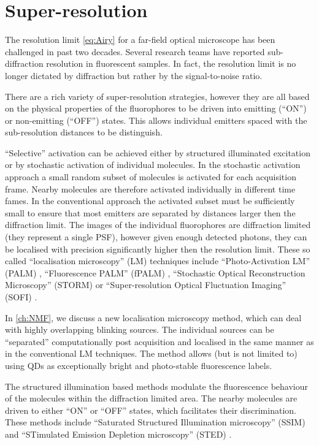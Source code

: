 \section{Super-resolution\label{sec:super-resolution}}

The resolution limit \autoref{eq:Airy} for a far-field optical microscope has been challenged in past two decades. Several research teams have reported sub-diffraction resolution in fluorescent samples. In fact, the resolution limit is no longer dictated by diffraction but rather by the signal-to-noise ratio. 

There are a rich variety of super-resolution strategies, however they are all based on the physical properties of the fluorophores to be driven into emitting (``ON'') or non-emitting (``OFF'') states. This allows individual emitters spaced with the sub-resolution distances to be distinguish.

``Selective'' activation can be achieved either by structured illuminated excitation or by stochastic activation of individual molecules. In the stochastic activation approach a small random subset of molecules is activated for each acquisition frame. Nearby molecules are therefore activated individually in different time fames. In the conventional approach the activated subset must be sufficiently small to ensure that most emitters are separated by distances larger then the diffraction limit. The images of the individual fluorophores are diffraction limited (they represent a single PSF), however given enough detected photons, they can be localised with precision significantly higher then the resolution limit. These so called ``localisation microscopy'' (LM) techniques include ``Photo-Activation LM'' (PALM) \cite{Betzig2006}, ``Fluorescence PALM'' (fPALM) \cite{Hess2006}, ``Stochastic Optical Reconstruction Microscopy'' (STORM) \cite{Rust2006} or ``Super-resolution Optical Fluctuation Imaging'' (SOFI) \cite{Dertinger2009}. 

In \autoref{ch:NMF}, we discuss a new localisation microscopy method, which can deal with highly overlapping blinking sources. The individual sources can be ``separated'' computationally post acquisition and localised in the same manner as in the conventional LM techniques. The method allows (but is not limited to) using QDs as exceptionally bright and photo-stable fluorescence labels.

The structured illumination based methods modulate the fluorescence behaviour of the molecules within the diffraction limited area. The nearby molecules are driven to either ``ON'' or ``OFF'' states, which facilitates their discrimination.  These methods include ``Saturated Structured Illumination microscopy'' (SSIM) \cite{Gustafsson2000,Heintzmann2002} and ``STimulated Emission Depletion microscopy'' (STED) \cite{Hell1994}. 

